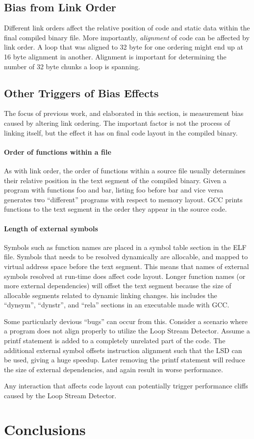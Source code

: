 \documentclass[a4paper,11pt,twocolumn,twoside]{article}
\begin{document}
\subsection{Bias from Link Order}
Different link orders affect the relative position of code and static data within the final compiled binary file.
More importantly, \emph{alignment} of code can be affected by link order.
A loop that was aligned to 32 byte for one ordering might end up at 16 byte alignment in another. 
Alignment is important for determining the number of 32 byte chunks a loop is spanning.

\subsection{Other Triggers of Bias Effects}
The focus of previous work, and elaborated in this section, is measurement bias caused by altering link ordering.
The important factor is not the process of linking itself, but the effect it has on final code layout in the compiled binary. 

\paragraph{Order of functions within a file}
As with link order, the order of functions within a source file usually determines their relative position in the text segment of the compiled binary. 
Given a program with functions foo and bar, listing foo before bar and vice versa generates two “different” programs with respect to memory layout. 
GCC prints functions to the text segment in the order they appear in the source code.

\paragraph{Length of external symbols}
Symbols such as function names are placed in a symbol table section in the ELF file.
Symbols that needs to be resolved dynamically are allocable, and mapped to virtual address space before the text segment. 
This means that names of external symbols resolved at run-time does affect code layout. 
Longer function names (or more external dependencies) will offset the text segment because the size of allocable segments related to dynamic linking changes. 
his includes the “dynsym”, “dynstr”, and “rela” sections in an executable made with GCC.

Some particularly devious “bugs” can occur from this. 
Consider a scenario where a program does not align properly to utilize the Loop Stream Detector. 
Assume a printf statement is added to a completely unrelated part of the code. 
The additional external symbol offsets instruction alignment such that the LSD can be used, giving a huge speedup.
Later removing the printf statement will reduce the size of external dependencies, and again result in worse performance. 

Any interaction that affects code layout can potentially trigger performance cliffs caused by the Loop Stream Detector.


\section{Conclusions}


\onecolumn



\end{document}
